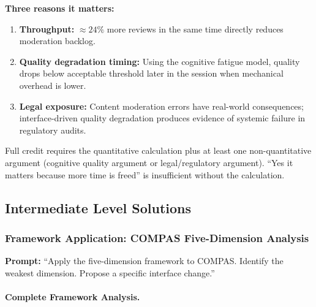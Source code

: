 \textbf{Three reasons it matters:}
\begin{enumerate}
    \item \textbf{Throughput:} $\approx 24\%$ more reviews in the same time directly reduces moderation backlog.
    \item \textbf{Quality degradation timing:} Using the cognitive fatigue model, quality drops below acceptable threshold later in the session when mechanical overhead is lower.
    \item \textbf{Legal exposure:} Content moderation errors have real-world consequences; interface-driven quality degradation produces evidence of systemic failure in regulatory audits.
\end{enumerate}

\begin{keyconcept}
Full credit requires the quantitative calculation plus at least one non-quantitative argument (cognitive quality argument or legal/regulatory argument). ``Yes it matters because more time is freed'' is insufficient without the calculation.
\end{keyconcept}

\subsection{Intermediate Level Solutions}

\subsubsection{Framework Application: COMPAS Five-Dimension Analysis}

\textbf{Prompt:} ``Apply the five-dimension framework to COMPAS. Identify the weakest dimension. Propose a specific interface change.''

\paragraph{Complete Framework Analysis.}

